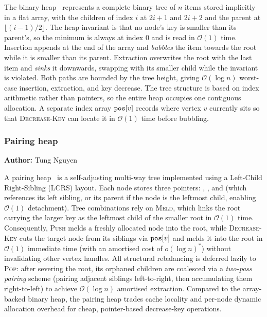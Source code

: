 \vspace{0.2cm}
\noindent
The binary heap~\cite{williams1964} represents a complete binary tree of $n$ items stored implicitly in a flat array, with the children of index $i$ at $2i+1$ and $2i+2$ and the parent at
$\lfloor (i-1)/2 \rfloor$. The heap invariant is that no node's key is smaller than its parent's, so the minimum is always at index $0$ and is read in $\mathcal{O}(1)$ time. Insertion appends at the end of the array and \emph{bubbles} the item towards the root while it is smaller than its parent. Extraction overwrites the root with the last item and \emph{sinks} it downwards, swapping with its smaller child while the invariant is violated. Both paths are bounded by the tree height, giving $\mathcal{O}(\log n)$ worst-case insertion, extraction, and key
decrease. The tree structure is based on index arithmetic rather than pointers, so the entire heap occupies one contiguous allocation. A separate index array $\code{pos}[v]$ records where vertex $v$ currently sits so that
\textsc{Decrease-Key} can locate it in $\mathcal{O}(1)$ time before bubbling.

\subsubsection{Pairing heap}
\vspace{-0.2cm}
{\small \textbf{Author:} Tung Nguyen}

\vspace{0.2cm}
\noindent
A pairing heap~\cite{fredman1986pairing} is a self-adjusting multi-way tree implemented using a Left-Child Right-Sibling (LCRS) layout. Each node stores three pointers: , , and  (which references its left sibling, or its parent if the node is the leftmost child, enabling $\mathcal{O}(1)$ detachment). Tree combinations rely on \textsc{Meld}, which links the root carrying the larger key as the leftmost child of the smaller root in $\mathcal{O}(1)$ time. Consequently, \textsc{Push} melds a freshly allocated node into the root, while \textsc{Decrease-Key} cuts the target node from its siblings via $\code{pos}[v]$ and melds it into the root in $\mathcal{O}(1)$ immediate time (with an amortised cost of $o(\log n)^*$) without invalidating other vertex handles. All structural rebalancing is deferred lazily to \textsc{Pop}: after severing the root, its orphaned children are coalesced via a \emph{two-pass pairing} scheme (pairing adjacent siblings left-to-right, then accumulating them right-to-left) to achieve $\mathcal{O}(\log n)$ amortised extraction. Compared to the array-backed binary heap, the pairing heap trades cache locality and per-node dynamic allocation overhead for cheap, pointer-based decrease-key operations.

